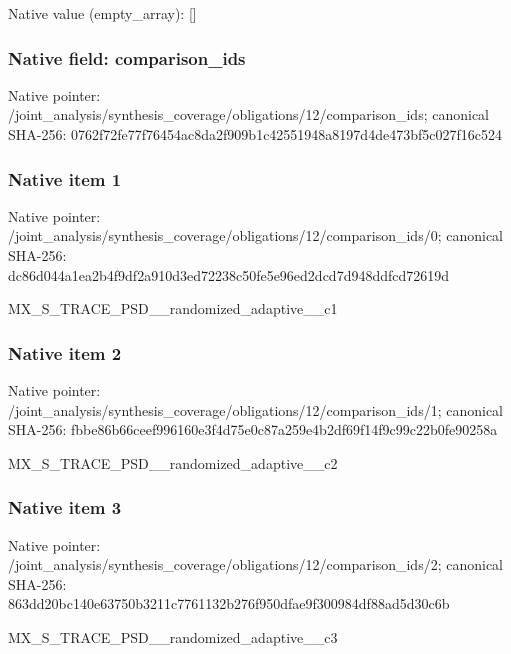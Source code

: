 \documentclass[10pt,a4paper]{article}
\begin{document}
Native value (empty\_\allowbreak{}array): []

\subsubsection{Native field: comparison\_\allowbreak{}ids}
Native pointer: /joint\_\allowbreak{}analysis/synthesis\_\allowbreak{}coverage/obligations/12/comparison\_\allowbreak{}ids; canonical SHA-256: 0762f72fe77f76454ac8da2f909b1c42551948a8197d4de473bf5c027f16c524

\subsubsection{Native item 1}
Native pointer: /joint\_\allowbreak{}analysis/synthesis\_\allowbreak{}coverage/obligations/12/comparison\_\allowbreak{}ids/0; canonical SHA-256: dc86d044a1ea2b4f9df2a910d3ed72238c50fe5e96ed2dcd7d948ddfcd72619d

\begingroup\raggedright\sloppy MX\_\allowbreak{}S\_\allowbreak{}TRACE\_\allowbreak{}PSD\_\allowbreak{}\_\allowbreak{}randomized\_\allowbreak{}adaptive\_\allowbreak{}\_\allowbreak{}c1\par\endgroup

\subsubsection{Native item 2}
Native pointer: /joint\_\allowbreak{}analysis/synthesis\_\allowbreak{}coverage/obligations/12/comparison\_\allowbreak{}ids/1; canonical SHA-256: fbbe86b66ceef996160e3f4d75e0c87a259e4b2df69f14f9c99c22b0fe90258a

\begingroup\raggedright\sloppy MX\_\allowbreak{}S\_\allowbreak{}TRACE\_\allowbreak{}PSD\_\allowbreak{}\_\allowbreak{}randomized\_\allowbreak{}adaptive\_\allowbreak{}\_\allowbreak{}c2\par\endgroup

\subsubsection{Native item 3}
Native pointer: /joint\_\allowbreak{}analysis/synthesis\_\allowbreak{}coverage/obligations/12/comparison\_\allowbreak{}ids/2; canonical SHA-256: 863dd20bc140e63750b3211c7761132b276f950dfae9f300984df88ad5d30c6b

\begingroup\raggedright\sloppy MX\_\allowbreak{}S\_\allowbreak{}TRACE\_\allowbreak{}PSD\_\allowbreak{}\_\allowbreak{}randomized\_\allowbreak{}adaptive\_\allowbreak{}\_\allowbreak{}c3\par\endgroup
\end{document}
